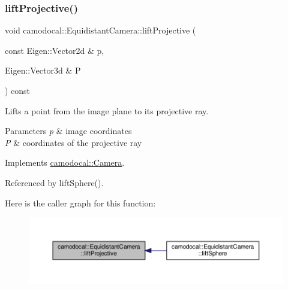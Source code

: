 \subsubsection{\texorpdfstring{lift\+Projective()}{liftProjective()}}
{\footnotesize\ttfamily void camodocal\+::\+Equidistant\+Camera\+::lift\+Projective (\begin{DoxyParamCaption}\item[{const Eigen\+::\+Vector2d \&}]{p,  }\item[{Eigen\+::\+Vector3d \&}]{P }\end{DoxyParamCaption}) const\hspace{0.3cm}{\ttfamily [virtual]}}



Lifts a point from the image plane to its projective ray. 


\begin{DoxyParams}{Parameters}
{\em p} & image coordinates \\
\hline
{\em P} & coordinates of the projective ray \\
\hline
\end{DoxyParams}


Implements \hyperlink{classcamodocal_1_1Camera_a680e97bfecab33cd833f914ee811d12d}{camodocal\+::\+Camera}.



Referenced by lift\+Sphere().

Here is the caller graph for this function\+:\nopagebreak
\begin{figure}[H]
\begin{center}
\leavevmode
\includegraphics[width=350pt]{classcamodocal_1_1EquidistantCamera_accd38ebf90227cc221d91dad7dd57dbb_icgraph}
\end{center}
\end{figure}
\mbox{\label{classcamodocal_1_1EquidistantCamera_ac86c8527e09b6df4eea4fd3c1322ba00}} 
